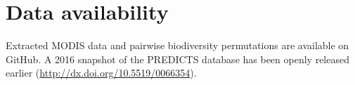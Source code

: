 \section{Data availability}
Extracted MODIS data and pairwise biodiversity permutations are available on GitHub. A 2016 snapshot of the PREDICTS database has been openly released earlier (\href{http://dx.doi.org/10.5519/0066354}{http://dx.doi.org/10.5519/0066354}).

\clearpage
%

%  
